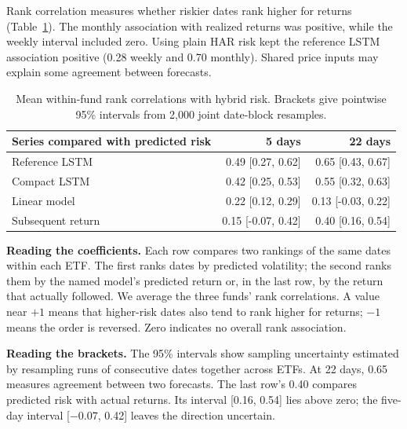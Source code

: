 \documentclass[11pt]{article}
\begin{document}
Rank correlation measures whether riskier dates rank higher for returns (Table~\ref{tab:assoc}). The monthly association with realized returns was positive, while the weekly interval included zero. Using plain HAR risk kept the reference LSTM association positive (0.28 weekly and 0.70 monthly). Shared price inputs may explain some agreement between forecasts.
\begin{table}[htbp]\centering\small\setlength{\tabcolsep}{4pt}\caption{Mean within-fund rank correlations with hybrid risk. Brackets give pointwise 95\% intervals from 2,000 joint date-block resamples.}\label{tab:assoc}
\begin{tabular}{lrr}\toprule
Series compared with predicted risk & 5 days & 22 days \\ \midrule
Reference LSTM & 0.49 [0.27, 0.62] & 0.65 [0.43, 0.67] \\
Compact LSTM & 0.42 [0.25, 0.53] & 0.55 [0.32, 0.63] \\
Linear model & 0.22 [0.12, 0.29] & 0.13 [-0.03, 0.22] \\
Subsequent return & 0.15 [-0.07, 0.42] & 0.40 [0.16, 0.54] \\\bottomrule\end{tabular}\par\vspace{6pt}\begin{minipage}{.97\linewidth}\small\setlength{\parskip}{4pt}
\textbf{Reading the coefficients.} Each row compares two rankings of the same dates within each ETF. The first ranks dates by predicted volatility; the second ranks them by the named model's predicted return or, in the last row, by the return that actually followed. We average the three funds' rank correlations. A value near $+1$ means that higher-risk dates also tend to rank higher for returns; $-1$ means the order is reversed. Zero indicates no overall rank association.

\textbf{Reading the brackets.} The 95\% intervals show sampling uncertainty estimated by resampling runs of consecutive dates together across ETFs. At 22 days, 0.65 measures agreement between two forecasts. The last row's 0.40 compares predicted risk with actual returns. Its interval [0.16, 0.54] lies above zero; the five-day interval [$-0.07$, 0.42] leaves the direction uncertain.
\end{minipage}\end{table}
\end{document}
